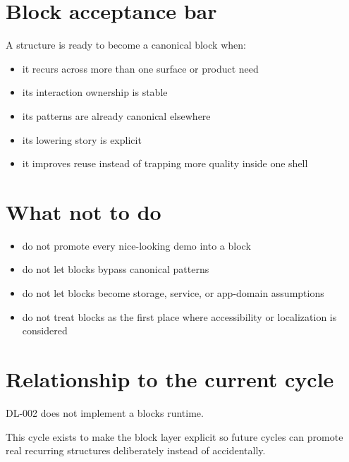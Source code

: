 \section{Block acceptance bar}\label{record-018-block-acceptance-bar}

A structure is ready to become a canonical block when:

\begin{itemize}
\tightlist
\item
  it recurs across more than one surface or product need
\item
  its interaction ownership is stable
\item
  its patterns are already canonical elsewhere
\item
  its lowering story is explicit
\item
  it improves reuse instead of trapping more quality inside one shell
\end{itemize}

\section{What not to do}\label{record-018-what-not-to-do}

\begin{itemize}
\tightlist
\item
  do not promote every nice-looking demo into a block
\item
  do not let blocks bypass canonical patterns
\item
  do not let blocks become storage, service, or app-domain assumptions
\item
  do not treat blocks as the first place where accessibility or localization is considered
\end{itemize}

\section{Relationship to the current cycle}\label{record-018-relationship-to-the-current-cycle}

DL-002 does not implement a blocks runtime.

This cycle exists to make the block layer explicit so future cycles can promote real recurring structures deliberately instead of accidentally.


